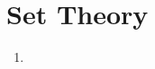 \documentclass{template/tutorial}
\begin{document}
    \maketitle
    \chapter{Set Theory}
        \begin{enumerate}
            \item
        \end{enumerate}
\end{document}
